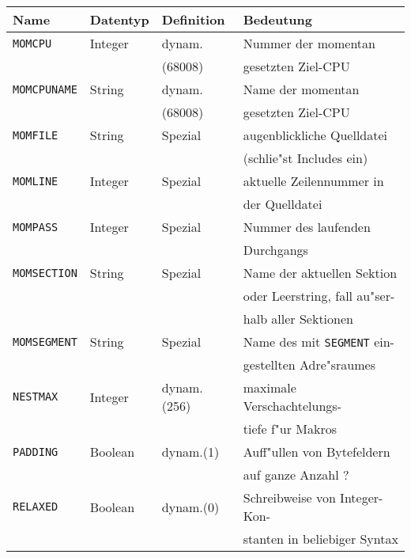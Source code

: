 \documentclass[12pt,a4paper,twoside]{report}
\newcommand{\tty}[1]{{\tt #1}}
\begin{document}
{\begin{table*}
\begin{center}\begin{tabular}{|l|l|l|l|}
\hline
Name             &  Datentyp   & Definition & Bedeutung \\
\hline\hline
\tty{MOMCPU}     &  Integer    & dynam.     & Nummer der momentan \\
                 &             & (68008)    & gesetzten Ziel-CPU \\
\hline
\tty{MOMCPUNAME} &  String     & dynam.     & Name der momentan \\
                 &             & (68008)    & gesetzten Ziel-CPU \\
\hline
\tty{MOMFILE}    &  String     & Spezial    & augenblickliche Quelldatei \\
                 &             &            & (schlie"st Includes ein) \\
\hline
\tty{MOMLINE}    &  Integer    & Spezial    & aktuelle Zeilennummer in \\
                 &             &            & der Quelldatei \\
\hline
\tty{MOMPASS}    &  Integer    & Spezial    & Nummer des laufenden \\
                 &             &            & Durchgangs \\
\hline
\tty{MOMSECTION} &  String     & Spezial    & Name der aktuellen Sektion \\
                 &             &            & oder Leerstring, fall au"ser- \\
                 &             &            & halb aller Sektionen \\
\hline
\tty{MOMSEGMENT} &  String     & Spezial    & Name des mit \tty{SEGMENT} ein- \\
                 &             &            & gestellten Adre"sraumes \\
\hline
\tty{NESTMAX}    &  Integer    & dynam.(256)& maximale Verschachtelungs- \\
                 &             &            & tiefe f"ur Makros \\
\hline
\tty{PADDING}    &  Boolean    & dynam.(1)  & Auff"ullen von Bytefeldern \\
                 &             &            & auf ganze Anzahl ? \\
\hline
\tty{RELAXED}    &  Boolean    & dynam.(0)  & Schreibweise von Integer-Kon- \\
                 &             &            & stanten in beliebiger Syntax \\

\end{tabular}
\end{center}
\end{table*}}
\end{document}
